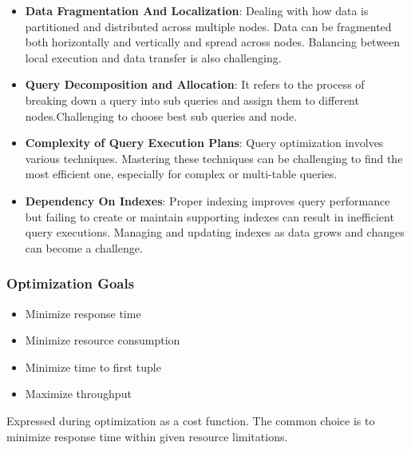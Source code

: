 \begin{itemize}
    \item\textbf{Data Fragmentation And Localization}: Dealing with how data is partitioned and distributed across multiple nodes. Data can be fragmented both horizontally and vertically and spread across nodes. Balancing between local execution and data transfer is also challenging. 
    \item\textbf{Query Decomposition and Allocation}: It refers to the process of breaking down a query into sub queries and assign them to different nodes.Challenging to choose best sub queries and node.
    \item\textbf{Complexity of Query Execution Plans}: Query optimization involves various techniques. Mastering these techniques can be challenging to find the most efficient one, especially for complex or multi-table queries.
    \item\textbf{Dependency On Indexes}: Proper indexing improves query performance but failing to create or maintain supporting indexes can result in inefficient query executions. Managing and updating indexes as data grows and changes can become a challenge.\\
    \cite{team-2020,etutorials-03-2024,editor-ijmter-2015}
\end{itemize}
\subsubsection*{Optimization Goals}

\begin{itemize}
    \item Minimize response time
    \item Minimize resource consumption
    \item Minimize time to first tuple
    \item Maximize throughput
\end{itemize}
Expressed during optimization as a cost function. The common choice is to minimize response time within given resource limitations.\\

